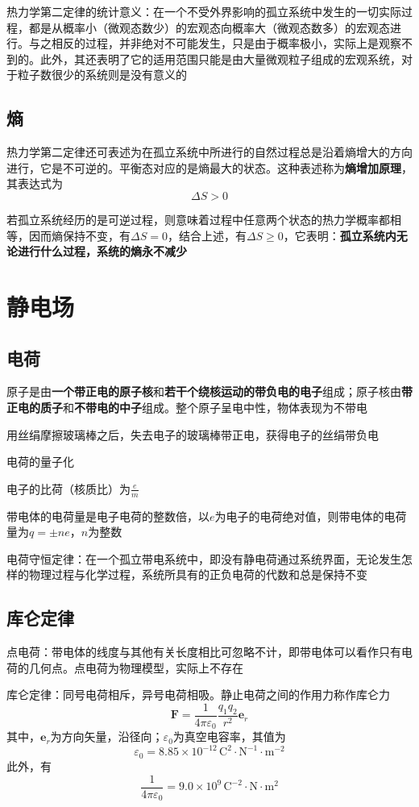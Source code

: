 \documentclass[12pt, a4paper, twoside]{ctexbook}
\begin{document}
{\sonti 热力学第二定律的统计意义}：在一个不受外界影响的孤立系统中发生的一切实际过程，都是从概率小（微观态数少）的宏观态向概率大（微观态数多）的宏观态进行。与之相反的过程，并非绝对不可能发生，只是由于概率极小，实际上是观察不到的。此外，其还表明了它的适用范围只能是由大量微观粒子组成的宏观系统，对于粒子数很少的系统则是没有意义的
\section{熵}
热力学第二定律还可表述为在孤立系统中所进行的自然过程总是沿着熵增大的方向进行，它是不可逆的。平衡态对应的是熵最大的状态。这种表述称为\textbf{熵增加原理}，其表达式为
$$
\Delta S>0
$$

若孤立系统经历的是可逆过程，则意味着过程中任意两个状态的热力学概率都相等，因而熵保持不变，有$\Delta S=0$，结合上述，有$\Delta S \geqslant 0$，它表明：\textbf{孤立系统内无论进行什么过程，系统的熵永不减少}
\chapter{静电场}
\newpage
\section{电荷}
原子是由\textbf{一个带正电的原子核}和\textbf{若干个绕核运动的带负电的电子}组成；原子核由\textbf{带正电的质子}和\textbf{不带电的中子}组成。整个原子呈电中性，物体表现为不带电

用丝绢摩擦玻璃棒之后，失去电子的玻璃棒带正电，获得电子的丝绢带负电

{\sonti 电荷的量子化}

电子的比荷（核质比）为$\frac{e}{m}$

带电体的电荷量是电子电荷的整数倍，以$e$为电子的电荷绝对值，则带电体的电荷量为$q=\pm ne$，$n$为整数

{\sonti 电荷守恒定律}：在一个孤立带电系统中，即没有静电荷通过系统界面，无论发生怎样的物理过程与化学过程，系统所具有的正负电荷的代数和总是保持不变
\section{库仑定律}
{\sonti 点电荷}：带电体的线度与其他有关长度相比可忽略不计，即带电体可以看作只有电荷的几何点。点电荷为物理模型，实际上不存在

{\sonti 库仑定律}：同号电荷相斥，异号电荷相吸。静止电荷之间的作用力称作库仑力
$$
\boldsymbol{F}=\frac{1}{4\pi \varepsilon _0}\frac{q_1q_2}{r^2}\boldsymbol{e}_r
$$
其中，$\boldsymbol{e}_r$为方向矢量，沿径向；$\varepsilon _0$为真空电容率，其值为
$$
\varepsilon _0=8.85\times 10^{-12}\,\mathrm{C}^2\cdot\mathrm{N}^{-1}\cdot\mathrm{m}^{-2}
$$
此外，有
$$
\frac{1}{4\pi \varepsilon _0}=9.0\times10^{9}\,\mathrm{C}^{-2}\cdot\mathrm{N}\cdot\mathrm{m}^{2}
$$
\end{document}
